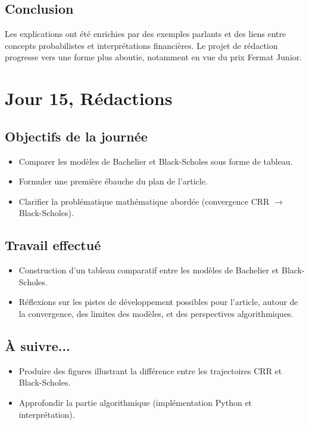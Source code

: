 \documentclass[a4paper,11pt]{article}
\begin{document}
\subsection{Conclusion}

Les explications ont été enrichies par des exemples parlants et des liens entre concepts probabilistes et interprétations financières. Le projet de rédaction progresse vers une forme plus aboutie, notamment en vue du prix Fermat Junior.
\newpage


\section{Jour 15, Rédactions}

\subsection{Objectifs de la journée}
\begin{itemize}
    \item Comparer les modèles de Bachelier et Black-Scholes sous forme de tableau.
    \item Formuler une première ébauche du plan de l’article.
    \item Clarifier la problématique mathématique abordée (convergence CRR $\rightarrow$ Black-Scholes).
\end{itemize}

\subsection{Travail effectué}
\begin{itemize}
    \item Construction d’un tableau comparatif entre les modèles de Bachelier et Black-Scholes.
    \item Réflexions sur les pistes de développement possibles pour l’article, autour de la convergence, des limites des modèles, et des perspectives algorithmiques.
\end{itemize}

\subsection{À suivre...}
\begin{itemize}
    \item Produire des figures illustrant la différence entre les trajectoires CRR et Black-Scholes.
    \item Approfondir la partie algorithmique (implémentation Python et interprétation).
\end{itemize}
\end{document}
